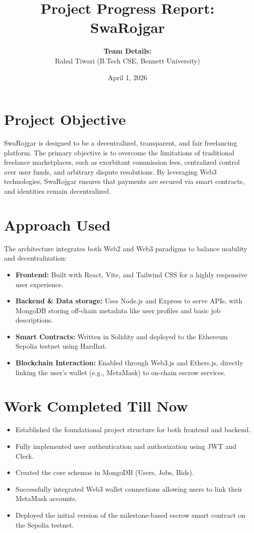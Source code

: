 \documentclass[11pt,a4paper]{article}
\title{\textbf{Project Progress Report: SwaRojgar}}
\author{\textbf{Team Details:}\\ Rahul Tiwari (B.Tech CSE, Bennett University)}
\date{April 1, 2026}
\begin{document}
\maketitle

\section{Project Objective}
SwaRojgar is designed to be a decentralized, transparent, and fair freelancing platform. The primary objective is to overcome the limitations of traditional freelance marketplaces, such as exorbitant commission fees, centralized control aver user funds, and arbitrary dispute resolutions. By leveraging Web3 technologies, SwaRojgar ensures that payments are secured via smart contracts, and identities remain decentralized.

\section{Approach Used}
The architecture integrates both Web2 and Web3 paradigms to balance usability and decentralization:
\begin{itemize}[noitemsep,topsep=0pt]
    \item \textbf{Frontend:} Built with React, Vite, and Tailwind CSS for a highly responsive user experience.
    \item \textbf{Backend \& Data storage:} Uses Node.js and Express to serve APIs, with MongoDB storing off-chain metadata like user profiles and basic job descriptions.
    \item \textbf{Smart Contracts:} Written in Solidity and deployed to the Ethereum Sepolia testnet using Hardhat.
    \item \textbf{Blockchain Interaction:} Enabled through Web3.js and Ethers.js, directly linking the user's wallet (e.g., MetaMask) to on-chain escrow services.
\end{itemize}

\section{Work Completed Till Now}
\begin{itemize}[noitemsep,topsep=0pt]
    \item Established the foundational project structure for both frontend and backend.
    \item Fully implemented user authentication and authorization using JWT and Clerk.
    \item Created the core schemas in MongoDB (Users, Jobs, Bids).
    \item Successfully integrated Web3 wallet connections allowing users to link their MetaMask accounts.
    \item Deployed the initial version of the milestone-based escrow smart contract on the Sepolia testnet.
\end{itemize}
\end{document}
